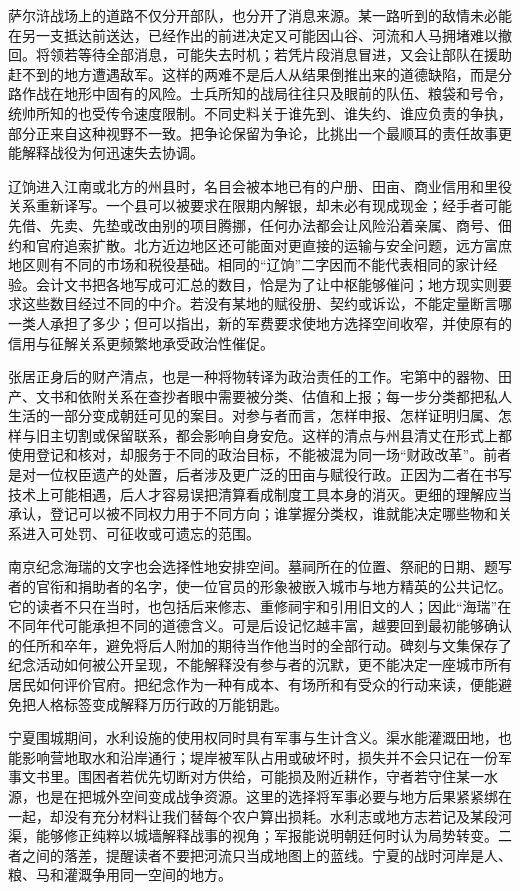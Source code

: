 萨尔浒战场上的道路不仅分开部队，也分开了消息来源。某一路听到的敌情未必能在另一支抵达前送达，已经作出的前进决定又可能因山谷、河流和人马拥堵难以撤回。将领若等待全部消息，可能失去时机；若凭片段消息冒进，又会让部队在援助赶不到的地方遭遇敌军。这样的两难不是后人从结果倒推出来的道德缺陷，而是分路作战在地形中固有的风险。士兵所知的战局往往只及眼前的队伍、粮袋和号令，统帅所知的也受传令速度限制。不同史料关于谁先到、谁失约、谁应负责的争执，部分正来自这种视野不一致。把争论保留为争论，比挑出一个最顺耳的责任故事更能解释战役为何迅速失去协调。

辽饷进入江南或北方的州县时，名目会被本地已有的户册、田亩、商业信用和里役关系重新译写。一个县可以被要求在限期内解银，却未必有现成现金；经手者可能先借、先卖、先垫或改由别的项目腾挪，任何办法都会让风险沿着亲属、商号、佃约和官府追索扩散。北方近边地区还可能面对更直接的运输与安全问题，远方富庶地区则有不同的市场和税役基础。相同的“辽饷”二字因而不能代表相同的家计经验。会计文书把各地写成可汇总的数目，恰是为了让中枢能够催问；地方现实则要求这些数目经过不同的中介。若没有某地的赋役册、契约或诉讼，不能定量断言哪一类人承担了多少；但可以指出，新的军费要求使地方选择空间收窄，并使原有的信用与征解关系更频繁地承受政治性催促。

张居正身后的财产清点，也是一种将物转译为政治责任的工作。宅第中的器物、田产、文书和依附关系在查抄者眼中需要被分类、估值和上报；每一步分类都把私人生活的一部分变成朝廷可见的案目。对参与者而言，怎样申报、怎样证明归属、怎样与旧主切割或保留联系，都会影响自身安危。这样的清点与州县清丈在形式上都使用登记和核对，却服务于不同的政治目标，不能被混为同一场“财政改革”。前者是对一位权臣遗产的处置，后者涉及更广泛的田亩与赋役行政。正因为二者在书写技术上可能相遇，后人才容易误把清算看成制度工具本身的消灭。更细的理解应当承认，登记可以被不同权力用于不同方向；谁掌握分类权，谁就能决定哪些物和关系进入可处罚、可征收或可遗忘的范围。

南京纪念海瑞的文字也会选择性地安排空间。墓祠所在的位置、祭祀的日期、题写者的官衔和捐助者的名字，使一位官员的形象被嵌入城市与地方精英的公共记忆。它的读者不只在当时，也包括后来修志、重修祠宇和引用旧文的人；因此“海瑞”在不同年代可能承担不同的道德含义。可是后设记忆越丰富，越要回到最初能够确认的任所和卒年，避免将后人附加的期待当作他当时的全部行动。碑刻与文集保存了纪念活动如何被公开呈现，不能解释没有参与者的沉默，更不能决定一座城市所有居民如何评价官府。把纪念作为一种有成本、有场所和有受众的行动来读，便能避免把人格标签变成解释万历行政的万能钥匙。

宁夏围城期间，水利设施的使用权同时具有军事与生计含义。渠水能灌溉田地，也能影响营地取水和沿岸通行；堤岸被军队占用或破坏时，损失并不会只记在一份军事文书里。围困者若优先切断对方供给，可能损及附近耕作，守者若守住某一水源，也是在把城外空间变成战争资源。这里的选择将军事必要与地方后果紧紧绑在一起，却没有充分材料让我们替每个农户算出损耗。水利志或地方志若记及某段河渠，能够修正纯粹以城墙解释战事的视角；军报能说明朝廷何时认为局势转变。二者之间的落差，提醒读者不要把河流只当成地图上的蓝线。宁夏的战时河岸是人、粮、马和灌溉争用同一空间的地方。

